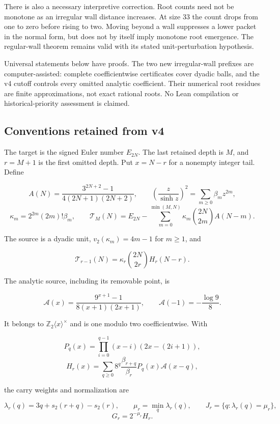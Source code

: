 \documentclass[11pt,letterpaper]{article}
\begin{document}
There is also a necessary interpretive correction. Root counts need not be monotone as an irregular wall distance increases. At size 33 the count drops from one to zero before rising to two. Moving beyond a wall suppresses a lower packet in the normal form, but does not by itself imply monotone root emergence. The regular-wall theorem remains valid with its stated unit-perturbation hypothesis.

Universal statements below have proofs. The two new irregular-wall prefixes are computer-assisted: complete coefficientwise certificates cover dyadic balls, and the v4 cutoff controls every omitted analytic coefficient. Their numerical root residues are finite approximations, not exact rational roots. No Lean compilation or historical-priority assessment is claimed.

\subsection{Conventions retained from v4}\label{conventions-retained-from-v4}

The target is the signed Euler number \(E_{2N}\). The last retained depth is \(M\), and \(r=M+1\) is the first omitted depth. Put \(x=N-r\) for a nonempty integer tail. Define

\[
A(N)=\frac{3^{2N+2}-1}{4(2N+1)(2N+2)},\qquad
\left(\frac z{\sinh z}\right)^2=\sum_{m\ge0}\beta_mz^{2m},
\] \[
\kappa_m=2^{2m}(2m)!\beta_m,
\qquad
\mathcal T_M(N)=E_{2N}-\sum_{m=0}^{\min(M,N)}
\kappa_m\binom{2N}{2m}A(N-m).
\]

The source is a dyadic unit, \(v_2(\kappa_m)=4m-1\) for \(m\ge1\), and

\[
\mathcal T_{r-1}(N)=\kappa_r\binom{2N}{2r}H_r(N-r).
\]

The analytic source, including its removable point, is

\[
\mathscr A(x)=\frac{9^{x+1}-1}{8(x+1)(2x+1)},
\qquad \mathscr A(-1)=-\frac{\log9}{8}.
\]

It belongs to \(\mathbb Z_2\langle x\rangle^\times\) and is one modulo two coefficientwise. With

\[
P_q(x)=\prod_{i=0}^{q-1}(x-i)(2x-(2i+1)),
\] \[
H_r(x)=\sum_{q\ge0}8^q\frac{\beta_{r+q}}{\beta_r}
P_q(x)\mathscr A(x-q),
\]

the carry weights and normalization are

\[
\lambda_r(q)=3q+s_2(r+q)-s_2(r),\qquad
\mu_r=\min_q\lambda_r(q),\qquad
J_r=\{q:\lambda_r(q)=\mu_r\},
\] \[
G_r=2^{-\mu_r}H_r.
\]
\end{document}
